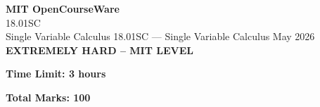 \documentclass[12pt,a4paper]{exam}
\begin{document}
\begin{center}
{\LARGE \textbf{MIT OpenCourseWare}}\\18.01SC\\Single Variable Calculus
\vspace{0.5cm}
{18.01SC} --- {Single Variable Calculus}
\vspace{0.3cm}
May 2026
\vspace{0.3cm}
\textbf{EXTREMELY HARD -- MIT LEVEL}
\end{center}

\begin{center}
\textbf{Time Limit: 3 hours}
\end{center}

\begin{center}
\textbf{Total Marks: 100}
\end{center}

\vspace{0.5cm}
\end{document}
